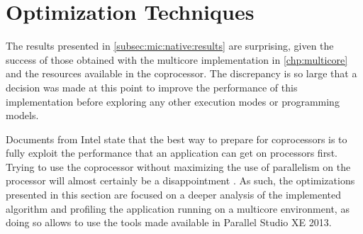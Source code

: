 \documentclass[../thesis]{subfiles}
\begin{document}
	\section{Optimization Techniques}
	\label{sec:mic:optims}

	The results presented in \cref{subsec:mic:native:results} are surprising, given the success of those obtained with the multicore implementation in \cref{chp:multicore} and the resources available in the \intel\xeonphi coprocessor. The discrepancy is so large that a decision was made at this point to improve the performance of this implementation before exploring any other execution modes or programming models.

	Documents from Intel state that the best way to prepare for \intel\xeonphi coprocessors is to fully exploit the performance that an application can get on \intel\xeon processors first. Trying to use the coprocessor without maximizing the use of parallelism on the processor will almost certainly be a disappointment \cite{Intel:MIC:Overview}. As such, the optimizations presented in this section are focused on a deeper analysis of the implemented algorithm and profiling the application running on a multicore environment, as doing so allows to use the tools made available in \intel Parallel Studio XE 2013.

	
	
	
	
	
\end{document}
